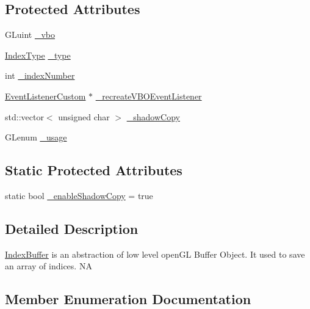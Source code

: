 \subsection*{Protected Attributes}
\begin{DoxyCompactItemize}
\item 
G\+Luint \hyperlink{classIndexBuffer_ace2f4e27a29e12609f3cfabeba313ead}{\+\_\+vbo}
\item 
\hyperlink{classIndexBuffer_ae2117eacd3734db21ce838397fe96c63}{Index\+Type} \hyperlink{classIndexBuffer_a1c52fd43df9ee187c098159c4061eed2}{\+\_\+type}
\item 
int \hyperlink{classIndexBuffer_ac949d739bdbfa1985042e6f76876cc35}{\+\_\+index\+Number}
\item 
\hyperlink{classEventListenerCustom}{Event\+Listener\+Custom} $\ast$ \hyperlink{classIndexBuffer_aabb8ba6760ff1b2edd23e09ae8f30aff}{\+\_\+recreate\+V\+B\+O\+Event\+Listener}
\item 
std\+::vector$<$ unsigned char $>$ \hyperlink{classIndexBuffer_a47a5fdea8d135784431e3f025a3a86d1}{\+\_\+shadow\+Copy}
\item 
G\+Lenum \hyperlink{classIndexBuffer_a264a0ecfe0b94b3e2bdb164c4ee6888f}{\+\_\+usage}
\end{DoxyCompactItemize}
\subsection*{Static Protected Attributes}
\begin{DoxyCompactItemize}
\item 
static bool \hyperlink{classIndexBuffer_a2c80b19e24d2fa4aa7e050aff5c1e75e}{\+\_\+enable\+Shadow\+Copy} = true
\end{DoxyCompactItemize}


\subsection{Detailed Description}
\hyperlink{classIndexBuffer}{Index\+Buffer} is an abstraction of low level open\+GL Buffer Object. It used to save an array of indices.  NA 

\subsection{Member Enumeration Documentation}
\mbox{\label{classIndexBuffer_ae2117eacd3734db21ce838397fe96c63}} 
